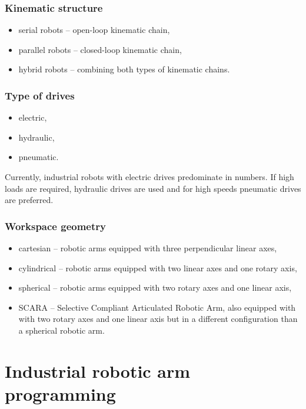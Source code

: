 \subsubsection*{Kinematic structure}

\begin{itemize}
    \item serial robots -- open-loop kinematic chain,
    \item parallel robots -- closed-loop kinematic chain,
    \item hybrid robots -- combining both types of kinematic chains.
\end{itemize}


\subsubsection*{Type of drives}

\begin{itemize}
    \item electric,
    \item hydraulic,
    \item pneumatic.
\end{itemize}

Currently, industrial robots with electric drives predominate in numbers. If high loads are required, hydraulic drives are used and for high speeds pneumatic drives are preferred.

\subsubsection*{Workspace geometry}

\begin{itemize}
    \item cartesian -- robotic arms equipped with three perpendicular linear axes,
    \item cylindrical -- robotic arms equipped with two linear axes and one rotary axis,
    \item spherical --  robotic arms equipped with two rotary axes and one linear axis,
    \item SCARA -- Selective Compliant Articulated Robotic Arm, also equipped with with two rotary axes and one linear axis but in a different configuration than a spherical robotic arm.
\end{itemize}

\section{Industrial robotic arm programming}

